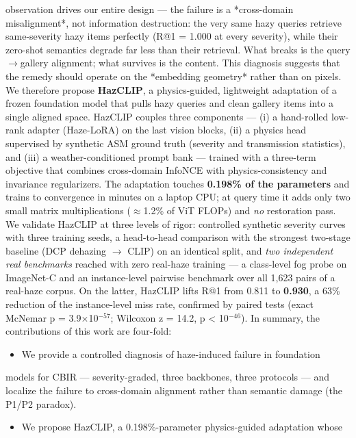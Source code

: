 \documentclass[journal]{IEEEtran}
\begin{document}
observation drives our entire design --- the failure is a *cross-domain
misalignment*, not information destruction: the very same hazy queries
retrieve same-severity hazy items perfectly (R@1 = 1.000 at every severity),
while their zero-shot semantics degrade far less than their retrieval.
What breaks is the query$\rightarrow$gallery alignment; what survives is the content.
This diagnosis suggests that the remedy should operate on the *embedding
geometry* rather than on pixels. We therefore propose \textbf{HazCLIP}, a
physics-guided, lightweight adaptation of a frozen foundation model that
pulls hazy queries and clean gallery items into a single aligned space.
HazCLIP couples three components --- (i) a hand-rolled low-rank adapter
(Haze-LoRA) on the last vision blocks, (ii) a physics head supervised by
synthetic ASM ground truth (severity and transmission statistics), and
(iii) a weather-conditioned prompt bank --- trained with a three-term
objective that combines cross-domain InfoNCE with physics-consistency and
invariance regularizers. The adaptation touches \textbf{0.198\% of the parameters}
and trains to convergence in minutes on a laptop CPU; at query time it adds
only two small matrix multiplications ($\approx$1.2\% of ViT FLOPs) and \emph{no}
restoration pass.
We validate HazCLIP at three levels of rigor: controlled synthetic severity
curves with three training seeds, a head-to-head comparison with the
strongest two-stage baseline (DCP dehazing \cite{he2010dcp} $\rightarrow$ CLIP) on an
identical split, and \emph{two independent real benchmarks} reached with zero
real-haze training --- a class-level fog probe on ImageNet-C
\cite{hendrycks2019imagenetc} and an instance-level pairwise benchmark over
all 1,623 pairs of a real-haze corpus. On the latter, HazCLIP lifts R@1 from
0.811 to \textbf{0.930}, a 63\% reduction of the instance-level miss rate,
confirmed by paired tests (exact McNemar p = 3.9$\times$10$^{-57}$; Wilcoxon z = 14.2,
p < 10$^{-46}$).
In summary, the contributions of this work are four-fold:
\begin{itemize}
\item We provide a controlled diagnosis of haze-induced failure in foundation
\end{itemize}
  models for CBIR --- severity-graded, three backbones, three protocols ---
  and localize the failure to cross-domain alignment rather than semantic
  damage (the P1/P2 paradox).
\begin{itemize}
\item We propose HazCLIP, a 0.198\%-parameter physics-guided adaptation whose
\end{itemize}
\end{document}
